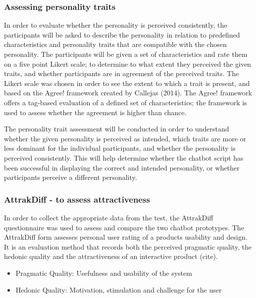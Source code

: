     \vspace{5mm} %

    \subsubsection{Assessing personality traits}
     
    In order to evaluate whether the personality is perceived consistently, the participants will be asked to describe the personality in relation to predefined characteristics and personality traits that are compatible with the chosen personality. The participants will be given a set of characteristics and rate them on a five point Likert scale; to determine to what extent they perceived the given traits, and whether participants are in agreement of the perceived traits. The Likert scale was chosen in order to see the extent to which a trait is present, and based on the Agree! framework created by Callejas (2014). The Agree! framework offers a tag-based evaluation of a defined set of characteristics; the framework is used to assess whether the agreement is higher than chance.
     
    The personality trait assessment will be conducted in order to understand whether the given personality is perceived as intended, which traits are more or less dominant for the individual participants, and whether the personality is perceived consistently. This will help determine whether the chatbot script has been successful in displaying the correct and intended personality, or whether participants perceive a different personality.
            
    \vspace{5mm} %
   
    \subsubsection{AttrakDiff - to assess attractiveness}
    
    In order to collect the appropriate data from the test, the AttrakDiff questionnaire was used to assess and compare the two chatbot prototypes. The AttrakDiff form assesses personal user rating of a products usability and design. It is an evaluation method that records both the perceived pragmatic quality, the hedonic quality and the attractiveness of an interactive product (cite).
    
    \begin{itemize}
        \item Pragmatic Quality: Usefulness and usability of the system
        \item Hedonic Quality: Motivation, stimulation and challenge for the user
    \end{itemize}

